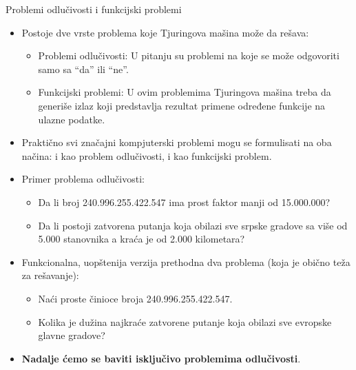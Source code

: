 \documentclass[aspectratio=169, xcolor=table, 10pt]{beamer}
\theoremstyle{definition}
\begin{document}
\begin{frame}{Problemi odlučivosti i funkcijski problemi}
\begin{itemize}

\item Postoje dve vrste problema koje Tjuringova mašina može da rešava:

\begin{itemize}
\item Problemi odlučivosti: U pitanju su problemi na koje se može odgovoriti samo sa “da” ili “ne”.

\item Funkcijski problemi: U ovim problemima Tjuringova mašina treba da generiše izlaz koji predstavlja rezultat primene određene funkcije na ulazne podatke. 
\end{itemize}

\item Praktično svi značajni kompjuterski problemi mogu se formulisati na oba načina: i kao problem odlučivosti, i kao funkcijski problem.

\item Primer problema odlučivosti:

\begin{itemize}
\item Da li broj  240.996.255.422.547 ima prost faktor manji od 15.000.000?

\item Da li postoji zatvorena putanja koja obilazi sve srpske gradove sa više od 5.000 stanovnika a kraća je od 2.000 kilometara?
\end{itemize}

\item Funkcionalna, uopštenija verzija prethodna dva problema (koja je obično teža za rešavanje):
\begin{itemize}
\item Naći proste činioce broja 240.996.255.422.547.

\item Kolika je dužina najkraće zatvorene putanje koja obilazi sve evropske glavne gradove?
\end{itemize}

\item \textbf{Nadalje ćemo se baviti isključivo problemima odlučivosti}.

\end{itemize}
\end{frame}
\end{document}
